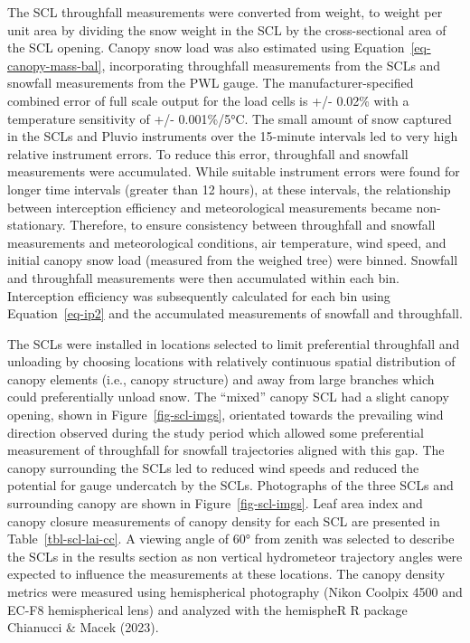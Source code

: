 \documentclass[
  letterpaper,
  DIV=11,
  numbers=noendperiod]{scrartcl}
\begin{document}
The SCL throughfall measurements were converted from weight, to weight
per unit area by dividing the snow weight in the SCL by the
cross-sectional area of the SCL opening. Canopy snow load was also
estimated using Equation~\ref{eq-canopy-mass-bal}, incorporating
throughfall measurements from the SCLs and snowfall measurements from
the PWL gauge. The manufacturer-specified combined error of full scale
output for the load cells is +/- 0.02\% with a temperature sensitivity
of +/- 0.001\%/5°C. The small amount of snow captured in the SCLs and
Pluvio instruments over the 15-minute intervals led to very high
relative instrument errors. To reduce this error, throughfall and
snowfall measurements were accumulated. While suitable instrument errors
were found for longer time intervals (greater than 12 hours), at these
intervals, the relationship between interception efficiency and
meteorological measurements became non-stationary. Therefore, to ensure
consistency between throughfall and snowfall measurements and
meteorological conditions, air temperature, wind speed, and initial
canopy snow load (measured from the weighed tree) were binned. Snowfall
and throughfall measurements were then accumulated within each bin.
Interception efficiency was subsequently calculated for each bin using
Equation~\ref{eq-ip2} and the accumulated measurements of snowfall and
throughfall.

The SCLs were installed in locations selected to limit preferential
throughfall and unloading by choosing locations with relatively
continuous spatial distribution of canopy elements (i.e., canopy
structure) and away from large branches which could preferentially
unload snow. The ``mixed'' canopy SCL had a slight canopy opening, shown
in Figure~\ref{fig-scl-imgs}, orientated towards the prevailing wind
direction observed during the study period which allowed some
preferential measurement of throughfall for snowfall trajectories
aligned with this gap. The canopy surrounding the SCLs led to reduced
wind speeds and reduced the potential for gauge undercatch by the SCLs.
Photographs of the three SCLs and surrounding canopy are shown in
Figure~\ref{fig-scl-imgs}. Leaf area index and canopy closure
measurements of canopy density for each SCL are presented in
Table~\ref{tbl-scl-lai-cc}. A viewing angle of 60° from zenith was
selected to describe the SCLs in the results section as non vertical
hydrometeor trajectory angles were expected to influence the
measurements at these locations. The canopy density metrics were
measured using hemispherical photography (Nikon Coolpix 4500 and EC-F8
hemispherical lens) and analyzed with the hemispheR R package Chianucci
\& Macek (2023).
\end{document}
